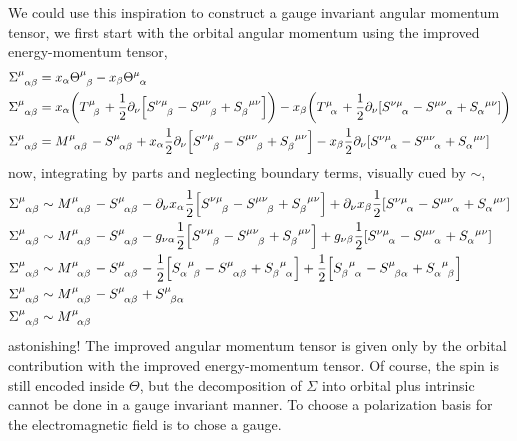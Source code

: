 We could use this inspiration to construct a gauge invariant angular momentum tensor, we first start with the orbital 
angular momentum using the improved energy-momentum tensor,
\begin{align}
    \tensor{\Sigma}{^\mu_\alpha_\beta}&=x_\alpha \tensor{\Theta}{^\mu_\beta}-x_\beta \tensor{\Theta}{^\mu_\alpha}\\
    \tensor{\Sigma}{^\mu_\alpha_\beta}&=x_\alpha \qty(\tensor{T}{^\mu_\beta} + \frac12\partial_\nu \qty[\tensor{S}{^\nu^\mu_\beta}-\tensor{S}{^\mu^\nu_\beta}+\tensor{S}{_\beta^\mu^\nu}])-x_\beta \qty(\tensor{T}{^\mu_\alpha} + \frac12\partial_\nu \qty[\tensor{S}{^\nu^\mu_\alpha}-\tensor{S}{^\mu^\nu_\alpha}+\tensor{S}{_\alpha^\mu^\nu}])\\
    \tensor{\Sigma}{^\mu_\alpha_\beta}&=\tensor{M}{^\mu_\alpha_\beta}-\tensor{S}{^\mu_\alpha_\beta}+x_\alpha \frac12\partial_\nu\qty[\tensor{S}{^\nu^\mu_\beta}-\tensor{S}{^\mu^\nu_\beta}+\tensor{S}{_\beta^\mu^\nu}]-x_\beta \frac12\partial_\nu\qty[\tensor{S}{^\nu^\mu_\alpha}-\tensor{S}{^\mu^\nu_\alpha}+\tensor{S}{_\alpha^\mu^\nu}]
\end{align}
now, integrating by parts and neglecting boundary terms, visually cued by $\sim$,
\begin{align}
    \tensor{\Sigma}{^\mu_\alpha_\beta}&\sim\tensor{M}{^\mu_\alpha_\beta}-\tensor{S}{^\mu_\alpha_\beta}-\partial_\nu x_\alpha \frac12\qty[\tensor{S}{^\nu^\mu_\beta}-\tensor{S}{^\mu^\nu_\beta}+\tensor{S}{_\beta^\mu^\nu}]+\partial_\nu x_\beta \frac12\qty[\tensor{S}{^\nu^\mu_\alpha}-\tensor{S}{^\mu^\nu_\alpha}+\tensor{S}{_\alpha^\mu^\nu}]\\
    \tensor{\Sigma}{^\mu_\alpha_\beta}&\sim\tensor{M}{^\mu_\alpha_\beta}-\tensor{S}{^\mu_\alpha_\beta}-g_{\nu\alpha} \frac12\qty[\tensor{S}{^\nu^\mu_\beta}-\tensor{S}{^\mu^\nu_\beta}+\tensor{S}{_\beta^\mu^\nu}]+g_{\nu\beta} \frac12\qty[\tensor{S}{^\nu^\mu_\alpha}-\tensor{S}{^\mu^\nu_\alpha}+\tensor{S}{_\alpha^\mu^\nu}]\\
    \tensor{\Sigma}{^\mu_\alpha_\beta}&\sim\tensor{M}{^\mu_\alpha_\beta}-\tensor{S}{^\mu_\alpha_\beta}- \frac12\qty[\tensor{S}{_\alpha^\mu_\beta}-\tensor{S}{^\mu_\alpha_\beta}+\tensor{S}{_\beta^\mu_\alpha}]+\frac12\qty[\tensor{S}{_\beta^\mu_\alpha}-\tensor{S}{^\mu_\beta_\alpha}+\tensor{S}{_\alpha^\mu_\beta}]\\
    \tensor{\Sigma}{^\mu_\alpha_\beta}&\sim\tensor{M}{^\mu_\alpha_\beta}-\tensor{S}{^\mu_\alpha_\beta}+\tensor{S}{^\mu_\beta_\alpha}\\
    \tensor{\Sigma}{^\mu_\alpha_\beta}&\sim\tensor{M}{^\mu_\alpha_\beta}
\end{align}
astonishing! The improved angular momentum tensor is given only by the orbital contribution with the improved energy-momentum tensor. Of course, the spin is still encoded inside $\Theta$, 
but the decomposition of $\Sigma$ into orbital plus intrinsic cannot be done in a gauge invariant manner. To choose a polarization basis for the electromagnetic field is to chose 
a gauge.